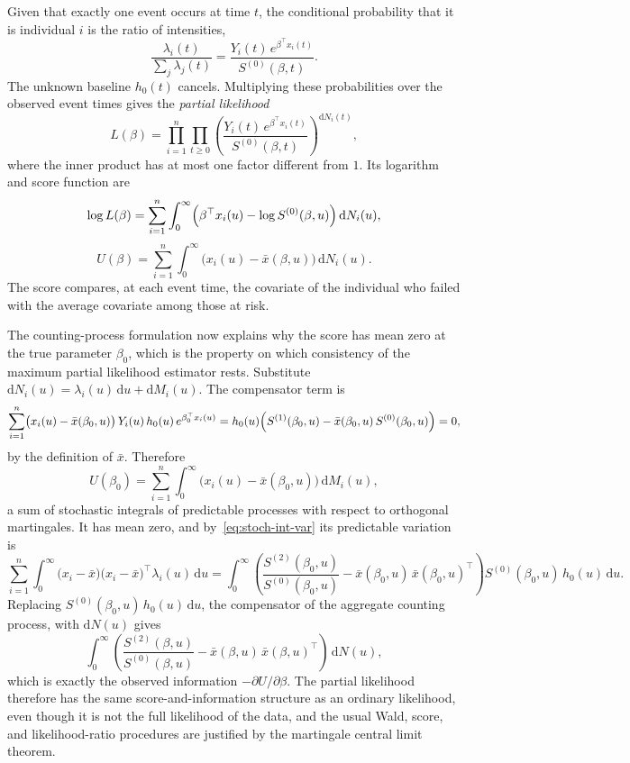\documentclass[11pt]{article}
\theoremstyle{definition}
\theoremstyle{plain}
\newcommand{\dd}{\,\mathrm{d}}
\begin{document}
Given that exactly one event occurs at time $t$, the conditional probability that it is individual $i$ is the ratio of intensities,
\[
  \frac{\lambda_i(t)}{\sum_j \lambda_j(t)}
  = \frac{Y_i(t)\,e^{\beta^\top x_i(t)}}{S^{(0)}(\beta, t)}.
\]
The unknown baseline $h_0(t)$ cancels. Multiplying these probabilities over the observed event times gives the \emph{partial likelihood}
\[
  L(\beta) = \prod_{i=1}^n \prod_{t \ge 0}
  \left(\frac{Y_i(t)\,e^{\beta^\top x_i(t)}}{S^{(0)}(\beta, t)}\right)^{\mathrm{d}N_i(t)},
\]
where the inner product has at most one factor different from $1$. Its logarithm and score function are
\[
  \log L(\beta) = \sum_{i=1}^n \int_0^\infty
    \Bigl(\beta^\top x_i(u) - \log S^{(0)}(\beta, u)\Bigr) \dd N_i(u),
\]
\[
  U(\beta) = \sum_{i=1}^n \int_0^\infty
    \bigl(x_i(u) - \bar{x}(\beta, u)\bigr) \dd N_i(u).
\]
The score compares, at each event time, the covariate of the individual who failed with the average covariate among those at risk.

The counting-process formulation now explains why the score has mean zero at the true parameter $\beta_0$, which is the property on which consistency of the maximum partial likelihood estimator rests. Substitute $\mathrm{d}N_i(u) = \lambda_i(u)\dd u + \mathrm{d}M_i(u)$. The compensator term is
\[
  \sum_{i=1}^n \bigl(x_i(u) - \bar{x}(\beta_0, u)\bigr)\,
    Y_i(u)\,h_0(u)\,e^{\beta_0^\top x_i(u)}
  = h_0(u)\Bigl(S^{(1)}(\beta_0, u) - \bar{x}(\beta_0, u)\,S^{(0)}(\beta_0, u)\Bigr)
  = 0,
\]
by the definition of $\bar{x}$. Therefore
\[
  U(\beta_0) = \sum_{i=1}^n \int_0^\infty
    \bigl(x_i(u) - \bar{x}(\beta_0, u)\bigr) \dd M_i(u),
\]
a sum of stochastic integrals of predictable processes with respect to orthogonal martingales. It has mean zero, and by~\eqref{eq:stoch-int-var} its predictable variation is
\[
  \sum_{i=1}^n \int_0^\infty
    \bigl(x_i - \bar{x}\bigr)\bigl(x_i - \bar{x}\bigr)^{\!\top} \lambda_i(u) \dd u
  = \int_0^\infty
    \left(\frac{S^{(2)}(\beta_0, u)}{S^{(0)}(\beta_0, u)}
      - \bar{x}(\beta_0, u)\,\bar{x}(\beta_0, u)^{\!\top}\right)
    S^{(0)}(\beta_0, u)\,h_0(u) \dd u.
\]
Replacing $S^{(0)}(\beta_0, u)\,h_0(u)\dd u$, the compensator of the aggregate counting process, with $\mathrm{d}N(u)$ gives
\[
  \int_0^\infty
    \left(\frac{S^{(2)}(\beta, u)}{S^{(0)}(\beta, u)}
      - \bar{x}(\beta, u)\,\bar{x}(\beta, u)^{\!\top}\right) \dd N(u),
\]
which is exactly the observed information $-\partial U / \partial \beta$. The partial likelihood therefore has the same score-and-information structure as an ordinary likelihood, even though it is not the full likelihood of the data, and the usual Wald, score, and likelihood-ratio procedures are justified by the martingale central limit theorem.
\end{document}
